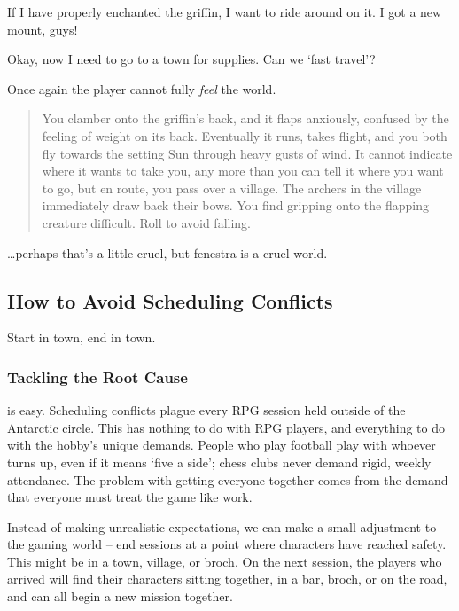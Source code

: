 \begin{multicols}{2}
\begin{boxtext}
  If I have properly enchanted the griffin, I want to ride around on it.
  I got a new mount, guys!

  Okay, now I need to go to a town for supplies.
  Can we `fast travel'?
\end{boxtext}

Once again the player cannot fully \emph{feel} the world.

\null
\begin{quote}
  You clamber onto the griffin's back, and it flaps anxiously, confused by the feeling of weight on its back.
  Eventually it runs, takes flight, and you both fly towards the setting Sun through heavy gusts of wind.
  It cannot indicate where it wants to take you, any more than you can tell it where you want to go, but en route, you pass over a \gls{village}.
  The archers in the \gls{village} immediately draw back their bows.
  You find gripping onto the flapping creature difficult.
  Roll  to avoid falling.
\end{quote}

\ldots perhaps that's a little cruel, but \gls{fenestra} is a cruel world.

\subsection{How to Avoid Scheduling Conflicts}

Start in town, end in town.

\subsubsection{Tackling the Root Cause}
is easy.
Scheduling conflicts plague every RPG session held outside of the Antarctic circle.
This has nothing to do with RPG players, and everything to do with the hobby's unique demands.
People who play football play with whoever turns up, even if it means `five a side'; chess clubs never demand rigid, weekly attendance.
The problem with getting everyone together comes from the demand that everyone must treat the game like work.

Instead of making unrealistic expectations, we can make a small adjustment to the gaming world -- end sessions at a point where characters have reached safety.
This might be in a town, \gls{village}, or \gls{broch}.
On the next session, the players who arrived will find their characters sitting together, in a bar, \gls{broch}, or on the road, and can all begin a new mission together.


\end{multicols}

